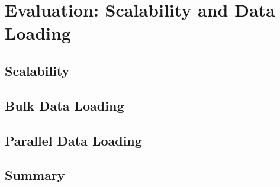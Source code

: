 {\chapter{Evaluation: Scalability and Data Loading}
\label{chap:Eval_4}

\section{Scalability}


\section{Bulk Data Loading}


\section{Parallel Data Loading}


\section{Summary}
}